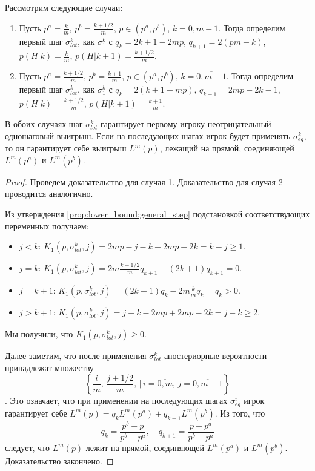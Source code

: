 \begin{prop}
\label{prop:lower_bound:lottery}
Рассмотрим следующие случаи:
\begin{enumerate}
\item
Пусть 
$ p^a = \frac{k}{m} $,
$ p^b = \frac{k+1/2}{m} $,
$ p \in \left(p^a, p^b\right) $, 
$ k = \overline{0, m-1} $. 
Тогда определим первый шаг $ \sigma^{k}_{lot} $, как $ \sigma^k_1 $ с 
$ q_k = 2k + 1 - 2mp $, 
$ q_{k+1} = 2(pm - k) $, 
$ p(H|k) = \frac{k}{m} $,
$ p(H|k+1) = \frac{k+1/2}{m} $.

\item
Пусть 
$ p^a = \frac{k+1/2}{m} $,
$ p^b = \frac{k+1}{m} $,
$ p \in \left(p^a, p^b\right) $, 
$ k = \overline{0, m-1} $. 
Тогда определим первый шаг $ \sigma^{k}_{lot} $, как $ \sigma^k_1 $ с 
$ q_k = 2(k + 1 - mp) $, 
$ q_{k+1} = 2mp - 2k - 1 $, 
$ p(H|k) = \frac{k+1/2}{m} $,
$ p(H|k+1) = \frac{k+1}{m} $.
\end{enumerate}

В обоих случаях шаг $ \sigma^k_{lot} $ гарантирует первому игроку неотрицательный одношаговый выигрыш. Если на последующих шагах игрок будет применять $ \sigma^k_{eq} $, то он гарантирует себе выигрыш $ L^m(p) $, лежащий на прямой, соединяющей $ L^m(p^a) $ и $ L^m(p^b) $.
\end{prop}
\begin{proof}
Проведем доказательство для случая 1. Доказательство для случая 2 проводится аналогично.

Из утверждения \ref{prop:lower_bound:general_step} подстановкой соответствующих переменных получаем:
\begin{itemize}
\item
    $ j < k $: 
        $ K_1(p, \sigma^k_{lot}, j) = 2mp - j - k - 2mp + 2k = k - j \geq 1 $.
\item
    $ j = k $:
        $ K_1(p, \sigma^k_{lot}, j) = 2m\frac{k+1/2}{m}q_{k+1} - (2k+1)q_{k+1} = 0 $.
\item
    $ j = k + 1 $:
        $ K_1(p, \sigma^k_{lot}, j) = (2k + 1)q_k - 2m\frac{k}{m}q_k = q_k > 0 $.
\item
    $ j > k + 1 $:
        $ K_1(p, \sigma^k_{lot}, j) = j + k - 2mp + 2mp - 2k = j - k \geq 2 $.
\end{itemize}

Мы получили, что $ K_1(p, \sigma^k_{lot}, j) \geq 0 $. 

Далее заметим, что после применения $ \sigma^k_{lot} $ апостериорные вероятности принадлежат множеству
\[
    \left\{
        \frac{i}{m}, \, \frac{j+1/2}{m}, \,|\, i = \overline{0, m}, \, j = \overline{0, m-1}
    \right\}
\].
Это означает, что при применении на последующих шагах $ \sigma^i_{eq} $ игрок гарантирует себе 
$ L^m(p) = q_k L^m(p^a) + q_{k+1} L^m(p^b) $. Из того, что 
\[
    q_k = \frac{p^b - p}{p^b - p^a}, \quad q_{k+1} = \frac{p - p^a}{p^b - p^a} 
\]
следует, что $ L^m(p) $ лежит на прямой, соединяющей $ L^m(p^a) $ и $ L^m(p^b) $. Доказательство закончено.
\end{proof}



